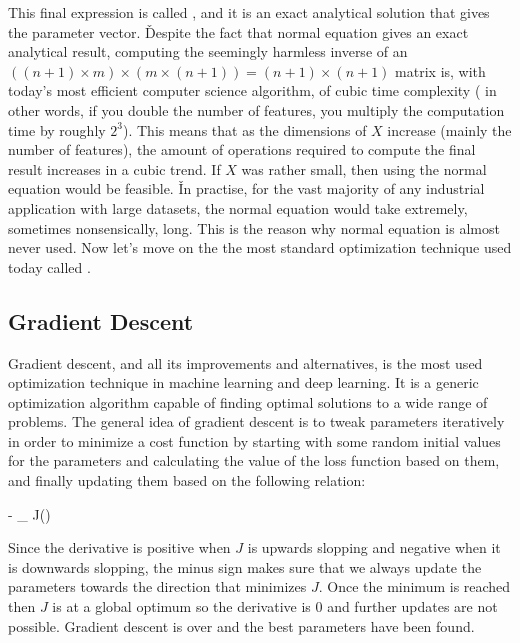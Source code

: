 This final expression is called , and it is an exact analytical solution that gives the
parameter vector. \v

Despite the fact that normal equation gives an exact analytical result, computing the seemingly harmless inverse of
an $((n+1) \times m) \times (m \times (n+1) ) = (n+1) \times (n+1)$ matrix is, with today's most efficient computer
science algorithm, of cubic time complexity ( in other words, if you double the number of features, you multiply the
computation time by roughly $2^3$). This means that as the dimensions of $X$ increase (mainly the number of features), 
the amount of operations required to compute the final result increases in a cubic trend. If $X$ was rather small,
then using the normal equation would be feasible. \v

In practise, for the vast majority of any industrial application with large datasets, the normal equation would take
extremely, sometimes nonsensically, long. This is the reason why normal equation is almost never used. Now let's move
on the the most standard optimization technique used today called .

\subsection{Gradient Descent}

Gradient descent, and all its improvements and alternatives, is the most used optimization technique in machine
learning and deep learning. It is a generic optimization algorithm capable of finding optimal solutions to a wide
range of problems. The general idea of gradient descent is to tweak parameters iteratively in order to minimize a
cost function by starting with some random initial values for the parameters and calculating the value of the loss
function based on them, and finally updating them based on the following relation:

\bse
{} \coloneqq {} - \alpha \nabla_{} J()
\ese
\ed

Since the derivative is positive when $J$ is upwards slopping and negative when it is downwards slopping, the minus
sign makes sure that we always update the parameters towards the direction that minimizes $J$. Once the minimum is
reached then $J$ is at a global optimum so the derivative is 0 and further updates are not possible. Gradient descent
is over and the best parameters have been found.

